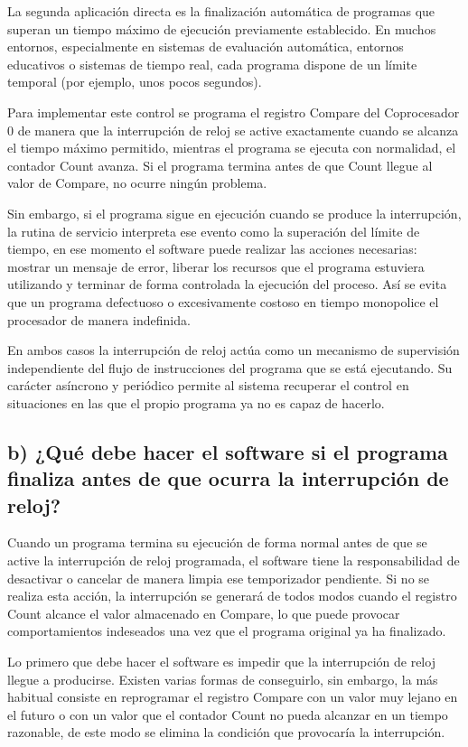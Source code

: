 \documentclass[12pt, letterpaper]{article}
\begin{document}
La segunda aplicación directa es la finalización automática de programas que superan un tiempo máximo de ejecución previamente establecido. En muchos entornos, especialmente en sistemas de evaluación automática, entornos educativos o sistemas de tiempo real, cada programa dispone de un límite temporal (por ejemplo, unos pocos segundos).

Para implementar este control se programa el registro Compare del Coprocesador 0 de manera que la interrupción de reloj se active exactamente cuando se alcanza el tiempo máximo permitido, mientras el programa se ejecuta con normalidad, el contador Count avanza. Si el programa termina antes de que Count llegue al valor de Compare, no ocurre ningún problema.

Sin embargo, si el programa sigue en ejecución cuando se produce la interrupción, la rutina de servicio interpreta ese evento como la superación del límite de tiempo, en ese momento el software puede realizar las acciones necesarias: mostrar un mensaje de error, liberar los recursos que el programa estuviera utilizando y terminar de forma controlada la ejecución del proceso. Así se evita que un programa defectuoso o excesivamente costoso en tiempo monopolice el procesador de manera indefinida.

En ambos casos la interrupción de reloj actúa como un mecanismo de supervisión independiente del flujo de instrucciones del programa que se está ejecutando. Su carácter asíncrono y periódico permite al sistema recuperar el control en situaciones en las que el propio programa ya no es capaz de hacerlo.

\subsection*{b) ¿Qué debe hacer el software si el programa finaliza antes de que ocurra la interrupción de reloj?}

Cuando un programa termina su ejecución de forma normal antes de que se active la interrupción de reloj programada, el software tiene la responsabilidad de desactivar o cancelar de manera limpia ese temporizador pendiente. Si no se realiza esta acción, la interrupción se generará de todos modos cuando el registro Count alcance el valor almacenado en Compare, lo que puede provocar comportamientos indeseados una vez que el programa original ya ha finalizado.

Lo primero que debe hacer el software es impedir que la interrupción de reloj llegue a producirse. Existen varias formas de conseguirlo, sin embargo, la más habitual consiste en reprogramar el registro Compare con un valor muy lejano en el futuro o con un valor que el contador Count no pueda alcanzar en un tiempo razonable, de este modo se elimina la condición que provocaría la interrupción.
\end{document}
